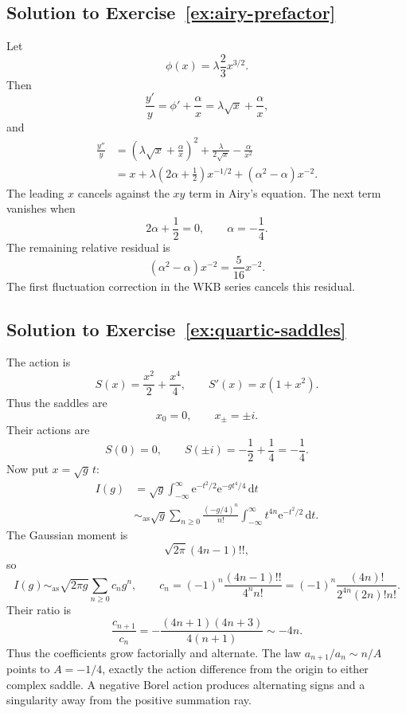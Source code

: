 \documentclass[11pt,oneside]{book}
\theoremstyle{definition}
\theoremstyle{remark}
\newcommand{\asympseries}{\sim_{\!\mathrm{as}}}
\newcommand{\e}{\mathrm{e}}
\newcommand{\dd}{\,\mathrm{d}}
\begin{document}
\subsection*{Solution to Exercise~\ref{ex:airy-prefactor}}

Let
\[
  \phi(x)=\lambda\frac23x^{3/2}.
\]
Then
\[
  \frac{y'}y=\phi'+\frac\alpha x
  =\lambda\sqrt x+\frac\alpha x,
\]
and
\begin{align*}
  \frac{y''}{y}
  &=\left(\lambda\sqrt x+\frac\alpha x\right)^2
    +\frac{\lambda}{2\sqrt x}-\frac\alpha{x^2}\\
  &=x+\lambda\left(2\alpha+\frac12\right)x^{-1/2}
    +(\alpha^2-\alpha)x^{-2}.
\end{align*}
The leading $x$ cancels against the $xy$ term in Airy's equation. The next term
vanishes when
\[
  2\alpha+\frac12=0,
  \qquad\alpha=-\frac14.
\]
The remaining relative residual is
\[
  (\alpha^2-\alpha)x^{-2}
  =\frac5{16}x^{-2}.
\]
The first fluctuation correction in the WKB series cancels this residual.

\subsection*{Solution to Exercise~\ref{ex:quartic-saddles}}

The action is
\[
  S(x)=\frac{x^2}{2}+\frac{x^4}{4},
  \qquad S'(x)=x(1+x^2).
\]
Thus the saddles are
\[
  x_0=0,
  \qquad x_\pm=\pm i.
\]
Their actions are
\[
  S(0)=0,
  \qquad S(\pm i)=-\frac12+\frac14=-\frac14.
\]
Now put $x=\sqrt g\,t$:
\begin{align*}
  I(g)
  &=\sqrt g\int_{-\infty}^{\infty}
    \e^{-t^2/2}\e^{-gt^4/4}\dd t\\
  &\asympseries
    \sqrt g\sum_{n\ge0}\frac{(-g/4)^n}{n!}
    \int_{-\infty}^{\infty}t^{4n}\e^{-t^2/2}\dd t.
\end{align*}
The Gaussian moment is
\[
  \sqrt{2\pi}(4n-1)!!,
\]
so
\begin{equation}
  I(g)\asympseries\sqrt{2\pi g}
  \sum_{n\ge0}c_ng^n,
  \qquad
  c_n=(-1)^n\frac{(4n-1)!!}{4^n n!}
      =(-1)^n\frac{(4n)!}{2^{4n}(2n)!n!}.
  \label{eq:quartic-coefficients}
\end{equation}
Their ratio is
\[
  \frac{c_{n+1}}{c_n}
  =-\frac{(4n+1)(4n+3)}{4(n+1)}
  \sim-4n.
\]
Thus the coefficients grow factorially and alternate. The law
$a_{n+1}/a_n\sim n/A$ points to $A=-1/4$, exactly the action difference from the
origin to either complex saddle. A negative Borel action produces alternating
signs and a singularity away from the positive summation ray.
\end{document}
